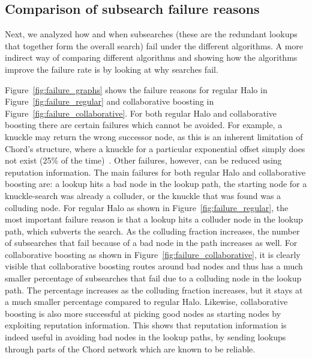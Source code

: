 \subsection{Comparison of subsearch failure reasons}

Next, we analyzed how and when subsearches (these are the redundant
lookups that together form the overall search) fail under the different
algorithms. A more indirect way of comparing different algorithms and
showing how the algorithms improve the failure rate is by looking at why
searches fail.

Figure~\ref{fig:failure_graphs} shows the failure reasons for regular
Halo in Figure~\ref{fig:failure_regular} and collaborative boosting in
Figure~\ref{fig:failure_collaborative}. For both regular Halo and
collaborative boosting there are certain failures which cannot be
avoided.  For example, a knuckle may return the wrong successor node,
as this is an inherent limitation of Chord's structure, where a knuckle
for a particular exponential offset simply does not exist (25\% of the
time)~\cite{halo}. Other failures, however, can be reduced using
reputation information. The main failures for both regular Halo and
collaborative boosting are: a lookup hits a bad node in the lookup
path, the starting node for a knuckle-search was already a colluder, or
the knuckle that was found was a colluding node.  For regular Halo as
shown in Figure~\ref{fig:failure_regular}, the most important failure
reason is that a lookup hits a colluder node in the lookup path, which
subverts the search. As the colluding fraction increases, the number of
subsearches that fail because of a bad node in the path increases as
well.  For collaborative boosting as shown in
Figure~\ref{fig:failure_collaborative}, it is clearly visible that
collaborative boosting routes around bad nodes and thus has a much
smaller percentage of subsearches that fail due to a colluding node in
the lookup path. The percentage increases as the colluding fraction
increases, but it stays at a much smaller percentage compared to
regular Halo. Likewise, collaborative boosting is also more successful
at picking good nodes as starting nodes by exploiting reputation
information.  This shows that reputation information is indeed useful
in avoiding bad nodes in the lookup paths, by sending lookups through
parts of the Chord network which are known to be reliable.

